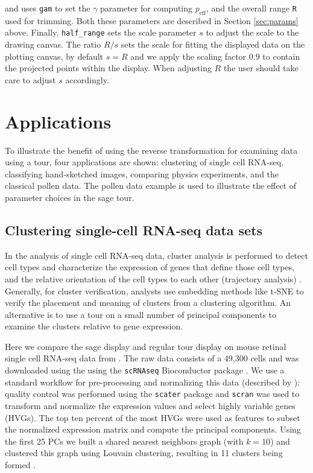 \documentclass[]{interact}
\theoremstyle{plain}%
\theoremstyle{definition}
\theoremstyle{remark}
\begin{document}
\noindent and uses \texttt{gam} to set the \(\gamma\) parameter for
computing \(p_{\mathrm{eff}}\), and the overall range \texttt{R} used
for trimming. Both these parameters are described in Section
\ref{sec:params} above. Finally, \texttt{half\_range} sets the scale
parameter \(s\) to adjust the scale to the drawing canvas. The ratio
\(R/s\) sets the scale for fitting the displayed data on the plotting
canvas, by default \(s = R\) and we apply the scaling factor \(0.9\) to
contain the projected points within the display. When adjusting \(R\)
the user should take care to adjust \(s\) accordingly.

\hypertarget{sec:application}{%
\section{Applications}\label{sec:application}}

To illustrate the benefit of using the reverse transformation for
examining data using a tour, four applications are shown: clustering of
single cell RNA-seq, classifying hand-sketched images, comparing physics
experiments, and the classical pollen data. The pollen data example is
used to illustrate the effect of parameter choices in the sage tour.

\hypertarget{sec:appl1}{%
\subsection{Clustering single-cell RNA-seq data sets}\label{sec:appl1}}

In the analysis of single cell RNA-seq data, cluster analysis is
performed to detect cell types and characterize the expression of genes
that define those cell types, and the relative orientation of the cell
types to each other (trajectory analysis) \citep{Amezquita2020-at}.
Generally, for cluster verification, analysts use embedding methods like
t-SNE to verify the placement and meaning of clusters from a clustering
algorithm. An alternative is to use a tour on a small number of
principal components to examine the clusters relative to gene
expression.

Here we compare the sage display and regular tour display on mouse
retinal single cell RNA-seq data from \citet{Macosko2015-ot}. The raw
data consists of a 49,300 cells and was downloaded using the using the
\texttt{scRNAseq} Bioconductor package \citep{scRNAseq-d}. We use a
standard workflow for pre-processing and normalizing this data
(described by \citet{Amezquita2020-at}): quality control was performed
using the \texttt{scater} package \citep{McCarthy2017} and
\texttt{scran} \citep{Lun2016} was used to transform and normalize the
expression values and select highly variable genes (HVGs). The top ten
percent of the most HVGs were used as features to subset the normalized
expression matrix and compute the principal components. Using the first
25 PCs we built a shared nearest neighbors graph (with \(k = 10\)) and
clustered this graph using Louvain clustering, resulting in 11 clusters
being formed \citep{Blondel2008-bx}.
\end{document}
